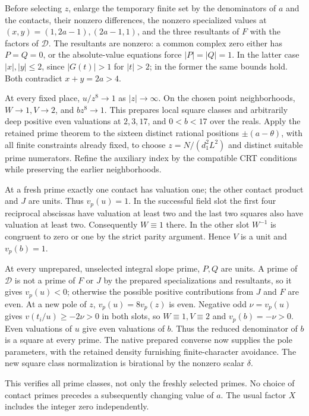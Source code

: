 \documentclass[11pt,a4paper]{article}
\begin{document}
Before selecting $z$, enlarge the temporary finite set by the denominators
of $a$ and the contacts, their nonzero differences, the nonzero specialized
values at $(x,y)=(1,2a-1),(2a-1,1)$, and the three resultants of $F$ with
the factors of $\mathcal D$. The resultants are nonzero: a common complex
zero either has $P=Q=0$, or the absolute-value equations force
$|P|=|Q|=1$. In the latter case $|x|,|y|\le2$, since $|G(t)|>1$ for
$|t|>2$; in the former the same bounds hold. Both contradict $x+y=2a>4$.

At every fixed place, $u/z^8\to1$ as $|z|\to\infty$.
On the chosen point neighborhoods, $W\to1,V\to2$, and $bz^8\to1$.
This prepares local square classes and arbitrarily deep positive even
valuations at $2,3,17$, and $0<b<17$ over the reals.
Apply the retained prime theorem to the sixteen distinct rational
positions $\pm(a-\theta)$, with all finite constraints already fixed,
to choose $z=N/(d_1^2L^2)$ and distinct suitable prime numerators.
Refine the auxiliary index by the compatible CRT conditions while
preserving the earlier neighborhoods.

At a fresh prime exactly one contact has valuation one; the other contact
product and $J$ are units. Thus $v_p(u)=1$. In the successful field slot
the first four reciprocal abscissas have valuation at least two and the
last two squares also have valuation at least two. Consequently
$W\equiv1$ there. In the other slot $W^{-1}$ is congruent to zero or one
by the strict parity argument. Hence $V$ is a unit and $v_p(b)=1$.

At every unprepared, unselected integral slope prime, $P,Q$ are units.
A prime of $\mathcal D$ is not a prime of $F$ or $J$ by the prepared
specializations and resultants, so it gives $v_p(u)<0$; otherwise the
possible positive contributions from $J$ and $F$ are even. At a new pole
of $z$, $v_p(u)=8v_p(z)$ is even. Negative odd $\nu=v_p(u)$ gives
$v(t_i/u)\ge-2\nu>0$ in both slots, so $W\equiv1,V\equiv2$ and
$v_p(b)=-\nu>0$. Even valuations of $u$ give even valuations of $b$.
Thus the reduced denominator of $b$ is a square at every prime.
The native prepared converse now supplies the pole parameters, with the
retained density furnishing finite-character avoidance. The new square
class normalization is birational by the nonzero scalar $\delta$.

This verifies all prime classes, not only the freshly selected primes.
No choice of contact primes precedes a subsequently changing value of $a$.
The usual factor $X$ includes the integer zero independently.
\end{document}
